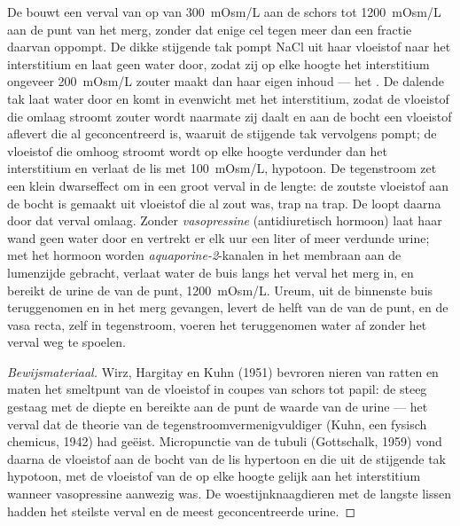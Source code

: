 \begin{proposition}[De tegenstroomvermenigvuldiger]\label{prop:b3:renal-osmoregulation:countercurrent}
De  bouwt een verval van  op van
\qty{300}{mOsm/L} aan de schors tot \qty{1200}{mOsm/L} aan de punt van
het merg, zonder dat enige cel tegen meer dan een fractie daarvan
oppompt. De dikke stijgende tak pompt NaCl uit haar vloeistof naar het
interstitium en laat geen water door, zodat zij op elke hoogte het
interstitium ongeveer \qty{200}{mOsm/L} zouter maakt dan haar eigen
inhoud --- het \emph{}. De dalende tak laat water
door en komt in evenwicht met het interstitium, zodat de vloeistof die
omlaag stroomt zouter wordt naarmate zij daalt en aan de bocht een
vloeistof aflevert die al geconcentreerd is, waaruit de stijgende tak
vervolgens pompt; de vloeistof die omhoog stroomt wordt op elke hoogte
verdunder dan het interstitium en verlaat de lis met \qty{100}{mOsm/L},
hypotoon. De tegenstroom zet een klein dwarseffect om in een groot
verval in de lengte: de zoutste vloeistof aan de bocht is gemaakt uit
vloeistof die al zout was, trap na trap. De  loopt daarna
door dat verval omlaag. Zonder \emph{vasopressine} (antidiuretisch
hormoon) laat haar wand geen water door en vertrekt er elk uur een
liter of meer verdunde urine; met het hormoon worden
\emph{aquaporine-2}-kanalen in het membraan aan de lumenzijde gebracht,
verlaat water de buis langs het verval het merg in, en bereikt de urine
de  van de punt, \qty{1200}{mOsm/L}. Ureum, uit de
binnenste buis teruggenomen en in het merg gevangen, levert de helft
van de  van de punt, en de vasa recta, zelf in tegenstroom,
voeren het teruggenomen water af zonder het verval weg te spoelen.
\end{proposition}

\begin{proof}[Bewijsmateriaal]
Wirz, Hargitay en Kuhn (1951) bevroren nieren van ratten en maten het
smeltpunt van de vloeistof in coupes van schors tot papil: de
 steeg gestaag met de diepte en bereikte aan de punt de
waarde van de urine --- het verval dat de theorie van de
tegenstroomvermenigvuldiger (Kuhn, een fysisch chemicus, 1942) had
geëist. Micropunctie van de tubuli (Gottschalk, 1959) vond daarna de
vloeistof aan de bocht van de lis hypertoon en die uit de stijgende tak
hypotoon, met de vloeistof van de  op elke hoogte gelijk
aan het interstitium wanneer vasopressine aanwezig was. De
woestijnknaagdieren met de langste lissen hadden het steilste verval en
de meest geconcentreerde urine.
\end{proof}

